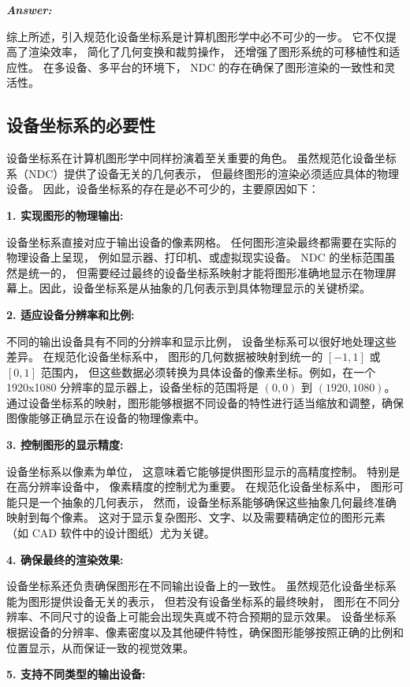 \documentclass[12pt]{article}
\newenvironment{Answer}{
  \vspace{12pt}
  {\large\textbf{\textit{\hspace{-12pt}Answer:}}}\par
  \vspace{8pt}
} {\vspace{24pt}}
\begin{document}
\begin{Answer}
综上所述，引入规范化设备坐标系是计算机图形学中必不可少的一步。
它不仅提高了渲染效率，
简化了几何变换和裁剪操作，
还增强了图形系统的可移植性和适应性。
在多设备、多平台的环境下，
NDC 的存在确保了图形渲染的一致性和灵活性。

\subsection*{设备坐标系的必要性}
\noindent

设备坐标系在计算机图形学中同样扮演着至关重要的角色。
虽然规范化设备坐标系（NDC）提供了设备无关的几何表示，
但最终图形的渲染必须适应具体的物理设备。
因此，设备坐标系的存在是必不可少的，主要原因如下：

\noindent\textbf{1. 实现图形的物理输出:}

设备坐标系直接对应于输出设备的像素网格。
任何图形渲染最终都需要在实际的物理设备上呈现，
例如显示器、打印机、或虚拟现实设备。
NDC 的坐标范围虽然是统一的，
但需要经过最终的设备坐标系映射才能将图形准确地显示在物理屏幕上。因此，设备坐标系是从抽象的几何表示到具体物理显示的关键桥梁。

\noindent\textbf{2. 适应设备分辨率和比例:}

不同的输出设备具有不同的分辨率和显示比例，
设备坐标系可以很好地处理这些差异。
在规范化设备坐标系中，
图形的几何数据被映射到统一的 $[-1, 1]$ 或 $[0, 1]$ 范围内，
但这些数据必须转换为具体设备的像素坐标。例如，在一个 1920x1080 分辨率的显示器上，设备坐标的范围将是 $(0, 0)$ 到 $(1920, 1080)$。通过设备坐标系的映射，图形能够根据不同设备的特性进行适当缩放和调整，确保图像能够正确显示在设备的物理像素中。

\noindent\textbf{3. 控制图形的显示精度:}

设备坐标系以像素为单位，
这意味着它能够提供图形显示的高精度控制。
特别是在高分辨率设备中，
像素精度的控制尤为重要。
在规范化设备坐标系中，
图形可能只是一个抽象的几何表示，
然而，设备坐标系能够确保这些抽象几何最终准确映射到每个像素。
这对于显示复杂图形、文字、以及需要精确定位的图形元素（如 CAD 软件中的设计图纸）尤为关键。

\noindent\textbf{4. 确保最终的渲染效果:}

设备坐标系还负责确保图形在不同输出设备上的一致性。
虽然规范化设备坐标系能为图形提供设备无关的表示，
但若没有设备坐标系的最终映射，
图形在不同分辨率、不同尺寸的设备上可能会出现失真或不符合预期的显示效果。
设备坐标系根据设备的分辨率、像素密度以及其他硬件特性，确保图形能够按照正确的比例和位置显示，从而保证一致的视觉效果。

\noindent\textbf{5. 支持不同类型的输出设备:}


\end{Answer}
\end{document}
